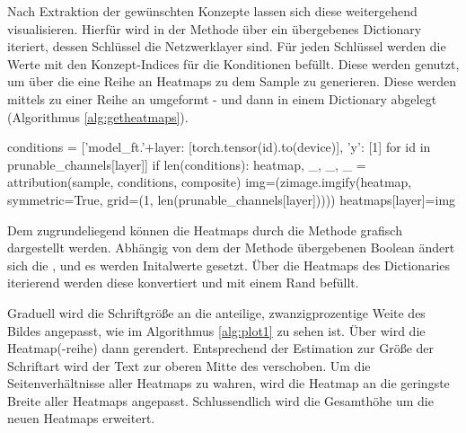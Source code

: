 Nach Extraktion der gewünschten Konzepte lassen sich diese weitergehend visualisieren. Hierfür wird in der Methode  über ein übergebenes Dictionary iteriert, dessen Schlüssel die Netzwerklayer sind. Für jeden Schlüssel werden die Werte mit den Konzept-Indices für die Konditionen  befüllt. Diese werden genutzt, um über die  eine Reihe an Heatmaps zu dem Sample zu generieren.
Diese werden mittels  zu einer Reihe an  umgeformt - und dann in einem Dictionary abgelegt (Algorithmus \ref{alg:getheatmaps}).

\newpage
\begin{python}[caption={Generierung von Heatmaps in Abhängigkeit vom Layer, dem Sample und den Konzepten  (Auszug aus der Methode \lstinline{gen_heatmaps()})}, label=alg:getheatmaps]
conditions = [{'model_ft.'+layer: [torch.tensor(id).to(device)], 'y': [1]} 
                                    for id in prunable_channels[layer]]
if len(conditions):
    heatmap, _, _, _ = attribution(sample, conditions, composite)
    img=(zimage.imgify(heatmap, symmetric=True, 
                grid=(1, len(prunable_channels[layer])))) 
    heatmaps[layer]=img
\end{python}
Dem zugrundeliegend können die Heatmaps durch die Methode  grafisch dargestellt werden. Abhängig von dem der Methode übergebenen Boolean  ändert sich die , und es werden Initalwerte gesetzt.
Über die Heatmaps des Dictionaries iterierend werden diese konvertiert und mit einem Rand befüllt.

Graduell wird die Schriftgröße an die anteilige, zwanzigprozentige Weite des Bildes angepasst, wie im Algorithmus \ref{alg:plot1} zu sehen ist. Über  wird die Heatmap(-reihe) dann gerendert. 
Entsprechend der Estimation zur Größe der Schriftart wird der Text zur oberen Mitte des  verschoben. Um die Seitenverhältnisse aller Heatmaps zu wahren, wird die Heatmap an die geringste Breite  aller Heatmaps angepasst.
Schlussendlich wird die Gesamthöhe um die neuen Heatmaps erweitert.

